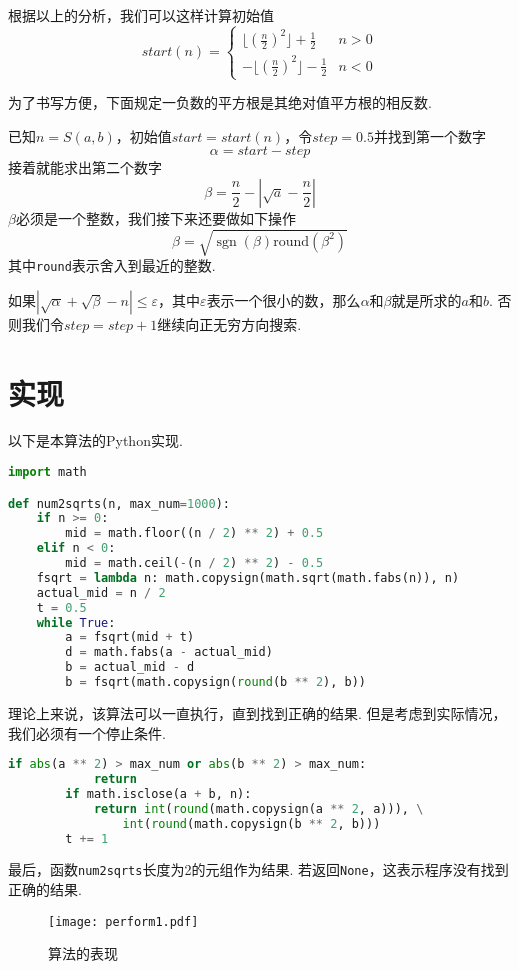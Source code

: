 \documentclass[a4paper, UTF8]{ctexart}
\DeclareMathOperator{\sgn}{\mathrm{sgn}}
\begin{document}
根据以上的分析，我们可以这样计算初始值
\[
    start(n)=
    \begin{cases}
        \lfloor(\frac{n}{2})^2\rfloor+\frac{1}{2}  &n>0 \\
        -\lfloor(\frac{n}{2})^2\rfloor-\frac{1}{2} &n<0
    \end{cases}
\]

为了书写方便，下面规定一负数的平方根是其绝对值平方根的相反数.

已知$n=S(a,b)$，初始值$start=start(n)$，令$step=0.5$并找到第一个数字\[\alpha=start-step\]接着就能求出第二个数字\[\beta=\frac{n}{2}-|\sqrt{a}-\frac{n}{2}|\]$\beta$必须是一个整数，我们接下来还要做如下操作\[\beta=\sqrt{\sgn(\beta)\mathrm{round}(\beta^2)}\]其中\verb|round|表示舍入到最近的整数.

如果$|\sqrt{\alpha}+\sqrt{\beta}-n|\leq\varepsilon$，其中$\varepsilon$表示一个很小的数，那么$\alpha$和$\beta$就是所求的$a$和$b$. 否则我们令$step=step+1$继续向正无穷方向搜索.

\section{实现}
以下是本算法的Python实现.

\begin{lstlisting}[language=python, name=example1]
import math

def num2sqrts(n, max_num=1000):
    if n >= 0:
        mid = math.floor((n / 2) ** 2) + 0.5
    elif n < 0:
        mid = math.ceil(-(n / 2) ** 2) - 0.5
    fsqrt = lambda n: math.copysign(math.sqrt(math.fabs(n)), n)
    actual_mid = n / 2
    t = 0.5
    while True:
        a = fsqrt(mid + t)
        d = math.fabs(a - actual_mid)
        b = actual_mid - d
        b = fsqrt(math.copysign(round(b ** 2), b))
\end{lstlisting}
理论上来说，该算法可以一直执行，直到找到正确的结果. 但是考虑到实际情况，我们必须有一个停止条件.
\begin{lstlisting}[language=python, name=example1]
        if abs(a ** 2) > max_num or abs(b ** 2) > max_num:
            return
        if math.isclose(a + b, n):
            return int(round(math.copysign(a ** 2, a))), \
                int(round(math.copysign(b ** 2, b)))
        t += 1
\end{lstlisting}
最后，函数\verb|num2sqrts|长度为2的元组作为结果. 若返回\verb|None|，这表示程序没有找到正确的结果.

\begin{figure}[tp]
    \centering
    \texttt{[image: perform1.pdf]}
    \caption{算法的表现}
    \label{fig:perform1}
\end{figure}
\end{document}
